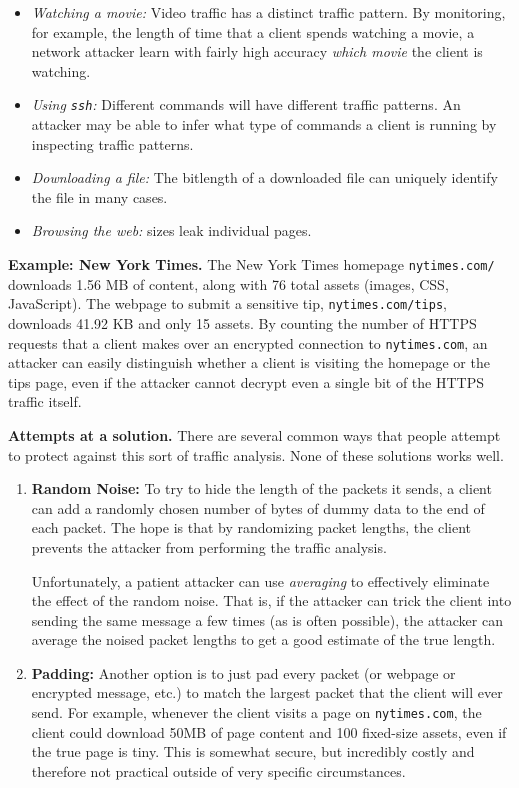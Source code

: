 \documentclass[
  letterpaper,
]{scrbook}
\providecommand{\tightlist}{%
  \setlength{\itemsep}{0pt}\setlength{\parskip}{0pt}}
\theoremstyle{definition}
\theoremstyle{plain}
\theoremstyle{plain}
\theoremstyle{remark}
\begin{document}
\begin{itemize}
\tightlist
\item
  \emph{Watching a movie:} Video traffic has a distinct traffic pattern.
  By monitoring, for example, the length of time that a client spends
  watching a movie, a network attacker learn with fairly high accuracy
  \emph{which movie} the client is watching.
\item
  \emph{Using \texttt{ssh}:} Different commands will have different
  traffic patterns. An attacker may be able to infer what type of
  commands a client is running by inspecting traffic patterns.
\item
  \emph{Downloading a file:} The bitlength of a downloaded file can
  uniquely identify the file in many cases.
\item
  \emph{Browsing the web:} sizes leak individual pages.
\end{itemize}

\textbf{Example: New York Times.} The New York Times homepage
\texttt{nytimes.com/} downloads 1.56 MB of content, along with 76 total
assets (images, CSS, JavaScript). The webpage to submit a sensitive tip,
\texttt{nytimes.com/tips}, downloads 41.92 KB and only 15 assets. By
counting the number of HTTPS requests that a client makes over an
encrypted connection to \texttt{nytimes.com}, an attacker can easily
distinguish whether a client is visiting the homepage or the tips page,
even if the attacker cannot decrypt even a single bit of the HTTPS
traffic itself.

\textbf{Attempts at a solution.} There are several common ways that
people attempt to protect against this sort of traffic analysis. None of
these solutions works well.

\begin{enumerate}
\def\labelenumi{\arabic{enumi}.}
\item
  \textbf{Random Noise:} To try to hide the length of the packets it
  sends, a client can add a randomly chosen number of bytes of dummy
  data to the end of each packet. The hope is that by randomizing packet
  lengths, the client prevents the attacker from performing the traffic
  analysis.

  Unfortunately, a patient attacker can use \emph{averaging} to
  effectively eliminate the effect of the random noise. That is, if the
  attacker can trick the client into sending the same message a few
  times (as is often possible), the attacker can average the noised
  packet lengths to get a good estimate of the true length.
\item
  \textbf{Padding:} Another option is to just pad every packet (or
  webpage or encrypted message, etc.) to match the largest packet that
  the client will ever send. For example, whenever the client visits a
  page on \texttt{nytimes.com}, the client could download 50MB of page
  content and 100 fixed-size assets, even if the true page is tiny. This
  is somewhat secure, but incredibly costly and therefore not practical
  outside of very specific circumstances.
\end{enumerate}
\end{document}
